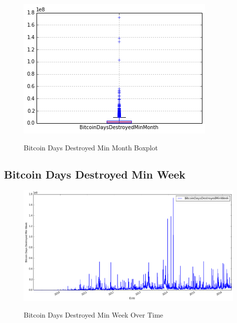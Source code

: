 \begin{figure}[bth]
  \myfloatalign
  {\includegraphics[width=1\linewidth]
    {gfx/bitcoin-days-destroyed-min-month-boxplot}}
  \caption{Bitcoin Days Destroyed Min Month Boxplot}
  \label{fig:bitcoin-days-destroyed-min-month-boxplot}
\end{figure}

\clearpage

\subsection{Bitcoin Days Destroyed Min Week}
\label{sec:bitcoin-days-destroyed-min-week}

\begin{figure}[bth]
  \myfloatalign
  {\includegraphics[width=1\linewidth]
    {gfx/bitcoin-days-destroyed-min-week-over-time}}
  \caption{Bitcoin Days Destroyed Min Week Over Time}
  \label{fig:bitcoin-days-destroyed-min-week-over-time}
\end{figure}

